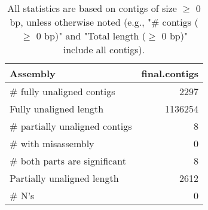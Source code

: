 \documentclass[12pt,a4paper]{article}
\begin{document}
\begin{table}[ht]
\begin{center}
\caption{All statistics are based on contigs of size $\geq$ 0 bp, unless otherwise noted (e.g., "\# contigs ($\geq$ 0 bp)" and "Total length ($\geq$ 0 bp)" include all contigs).}
\begin{tabular}{|l*{1}{|r}|}
\hline
Assembly & final.contigs \\ \hline
\# fully unaligned contigs & 2297 \\ \hline
Fully unaligned length & 1136254 \\ \hline
\# partially unaligned contigs & 8 \\ \hline
\hspace{5mm}\# with misassembly & 0 \\ \hline
\hspace{5mm}\# both parts are significant & 8 \\ \hline
Partially unaligned length & 2612 \\ \hline
\# N's & 0 \\ \hline
\end{tabular}
\end{center}
\end{table}
\end{document}
